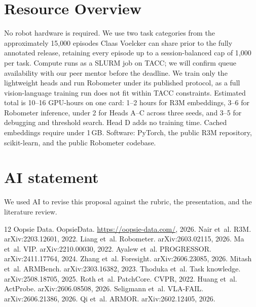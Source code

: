 \documentclass{article}
\begin{document}
\section{Resource Overview}
No robot hardware is required. We use two task categories from the approximately 15{,}000 episodes Claas Voelcker can share prior to the fully annotated release, retaining every episode up to a session-balanced cap of 1{,}000 per task. Compute runs as a SLURM job on TACC; we will confirm queue availability with our peer mentor before the deadline. We train only the lightweight heads and run Robometer under its published protocol, as a full vision-language training run does not fit within TACC constraints. Estimated total is 10--16 GPU-hours on one card: 1--2 hours for R3M embeddings, 3--6 for Robometer inference, under 2 for Heads A--C across three seeds, and 3--5 for debugging and threshold search. Head D adds no training time. Cached embeddings require under 1\,GB. Software: PyTorch, the public R3M repository, scikit-learn, and the public Robometer codebase.

\section{AI statement}
We used AI to revise this proposal against the rubric, the presentation, and the literature review.

\begingroup
\scriptsize
\raggedright
\setlength{\parskip}{0pt}
\setlength{\itemsep}{0pt}
\setlength{\parsep}{0pt}
\setlength{\bibsep}{0pt}
\begin{thebibliography}{12}
 Oopsie Data. OopsieData. \url{https://oopsie-data.com/}, 2026.
 Nair et~al. R3M. arXiv:2203.12601, 2022.
 Liang et~al. Robometer. arXiv:2603.02115, 2026.
 Ma et~al. VIP. arXiv:2210.00030, 2022.
 Ayalew et~al. PROGRESSOR. arXiv:2411.17764, 2024.
 Zhang et~al. Foresight. arXiv:2606.23085, 2026.
 Mitash et~al. ARMBench. arXiv:2303.16382, 2023.
 Thoduka et~al. Task knowledge. arXiv:2508.18705, 2025.
 Roth et~al. PatchCore. CVPR, 2022.
 Huang et~al. ActProbe. arXiv:2606.08508, 2026.
 Seligmann et~al. VLA-FAIL. arXiv:2606.21386, 2026.
 Qi et~al. ARMOR. arXiv:2602.12405, 2026.
\end{thebibliography}
\endgroup
\end{document}
